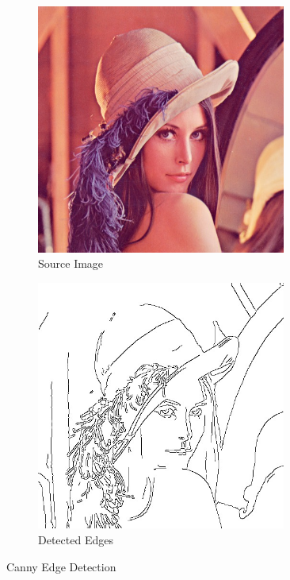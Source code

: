 \documentclass[a4paper,bibliography=totocnumbered,parskip,headsepline]{scrbook}
\begin{document}
\begin{figure}
\begin{subfigure}{0.5\textwidth}
    \centering
    \includegraphics[width=0.9\textwidth]{images/benchmarks/canny/lena}
    \caption{Source Image}
\end{subfigure}
\begin{subfigure}{0.5\textwidth}
    \centering
    \includegraphics[width=0.9\textwidth]{images/benchmarks/canny/lena-edges}
    \caption{Detected Edges}
\end{subfigure}
\caption{Canny Edge Detection}
\label{fig:lena}
\end{figure}
\end{document}
